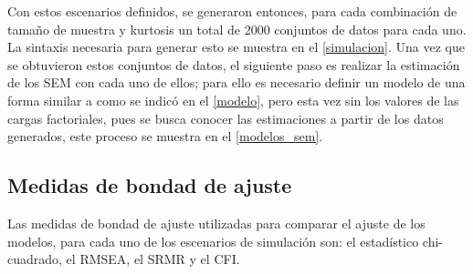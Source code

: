 \documentclass[
]{article}
\begin{document}
\begin{table}[!h]

\caption{\label{tab:unnamed-chunk-6}\label{tab:escenarios}Escenarios de simulación}
\centering
{}
\end{table}

Con estos escenarios definidos, se generaron entonces, para cada
combinación de tamaño de muestra y kurtosis un total de 2000 conjuntos
de datos para cada uno. La sintaxis necesaria para generar esto se
muestra en el \ref{simulacion}. Una vez que se obtuvieron estos
conjuntos de datos, el siguiente paso es realizar la estimación de los
SEM con cada uno de ellos; para ello es necesario definir un modelo de
una forma similar a como se indicó en el \ref{modelo}, pero esta vez sin
los valores de las cargas factoriales, pues se busca conocer las
estimaciones a partir de los datos generados, este proceso se muestra en
el \ref{modelos_sem}.

\subsection{Medidas de bondad de ajuste}

Las medidas de bondad de ajuste utilizadas para comparar el ajuste de
los modelos, para cada uno de los escenarios de simulación son: el
estadístico chi-cuadrado, el RMSEA, el SRMR y el CFI.
\end{document}
